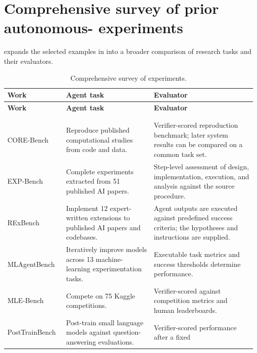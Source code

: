 \section{Comprehensive survey of prior autonomous-\agentrd{} experiments}
\label{app:prior-work-appendix}

 expands the selected examples in
 into a broader comparison of research tasks and their
evaluators.

{\small
\begin{longtable}{@{}P{0.21\textwidth}P{0.30\textwidth}P{0.39\textwidth}@{}}
\caption{Comprehensive survey of \agentrd{} experiments.}
\label{tab:prior-work-appendix}\\
\toprule
\textbf{Work} & \textbf{Agent task} & \textbf{Evaluator} \\
\midrule
\endfirsthead
\toprule
\textbf{Work} & \textbf{Agent task} & \textbf{Evaluator} \\
\midrule
\endhead
\bottomrule
\endfoot
{} \\
\addlinespace[3pt]
 \\
\addlinespace[2pt]
CORE-Bench~\citep{corebench} & Reproduce published computational studies from
code and data. & Verifier-scored reproduction benchmark; later system results
can be compared on a common task set. \\
EXP-Bench~\citep{expbench} & Complete experiments extracted from 51 published
AI papers. & Step-level assessment of design, implementation, execution, and
analysis against the source procedure. \\
RExBench~\citep{rexbench} & Implement 12 expert-written extensions to published
AI papers and codebases. & Agent outputs are executed against predefined
success criteria; the hypotheses and instructions are supplied. \\
MLAgentBench~\citep{mlagentbench} & Iteratively improve models across 13
machine-learning experimentation tasks. & Executable task metrics and success
thresholds determine performance. \\
MLE-Bench~\citep{mlebench} & Compete on 75 Kaggle competitions. &
Verifier-scored against competition metrics and human leaderboards. \\
PostTrainBench~\citep{posttrainbench} & Post-train small language models against
question-answering evaluations. & Verifier-scored performance after a fixed

\end{longtable}}
